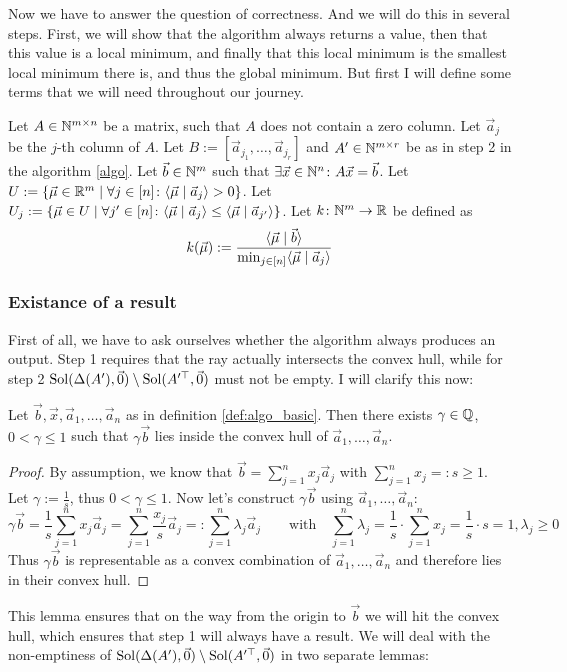 Now we have to answer the question of correctness. And we will do this in several steps. First, we will show that the algorithm always returns a value, then that this value is a local minimum, and finally that this local minimum is the smallest local minimum there is, and thus the global minimum. But first I will define some terms that we will need throughout our journey.
\begin{definition}
    \label{def:algo_basic}
    Let $A \in \mathbb{N}^{m \times n}$ be a matrix, such that $A$ does not contain a zero column. Let $\vec a_j$ be the $j$-th column of $A$. Let $B := [\vec a_{j_1}, \dots, \vec a_{j_r}]$ and $A' \in \mathbb{N}^{m\times r}$ be as in step 2 in the algorithm \ref{algo}. Let $\vec b \in \mathbb{N}^m$ such that $\exists \vec x \in \mathbb{N}^n\colon A\vec x = \vec b$. Let $U := \{\vec\mu \in \mathbb{R}^m\mid \forall j \in [n]\colon\langle \vec\mu \mid \vec a_j \rangle > 0\}$. Let $U_j := \{\vec\mu \in U \mid \forall j'\in[n]\colon \langle \vec\mu \mid \vec a_j \rangle \leq \langle \vec\mu \mid \vec a_{j'} \rangle\}$. Let $k\colon \mathbb{N}^m\to\mathbb{R}$ be defined as 
    $$k(\vec\mu) := \frac{\langle \vec\mu \mid \vec b \rangle}{\min_{j\in[n]}\langle \vec\mu \mid \vec a_j \rangle}$$
\end{definition}

\subsubsection{Existance of a result}
First of all, we have to ask ourselves whether the algorithm always produces an output. Step 1 requires that the ray actually intersects the convex hull, while for step 2 $\operatorname{Sol}(\Delta(A'), \vec0) \setminus \operatorname{Sol}(A'^\top, \vec0)$ must not be empty. I will clarify this now:

\begin{lemma}
    \label{lemma:b_behind_hull}
    Let $\vec b, \vec x, \vec a_1, \dots, \vec a_n$ as in definition \ref{def:algo_basic}. Then there exists $\gamma \in \mathbb{Q}$, $0 < \gamma \leq 1$ such that $\gamma \vec b$ lies inside the convex hull of $\vec a_1, \dots, \vec a_n$.
\end{lemma}
\begin{proof}
    By assumption, we know that $\vec b = \sum_{j=1}^{n}x_j \vec a_j$ with $\sum_{j=1}^{n}x_j =: s \geq 1$. Let $\gamma := \frac{1}{s}$, thus $0 < \gamma \leq 1$. Now let's construct $\gamma\vec b$ using $\vec a_1, \dots, \vec a_n$:
    $$\gamma\vec b = \frac{1}{s}\sum_{j=1}^{n}x_j \vec a_j = \sum_{j=1}^{n}\frac{x_j}{s}\vec a_j =: \sum_{j=1}^{n} \lambda_j\vec a_j \qquad \mathrm{with}\quad \sum_{j=1}^{n}\lambda_j = \frac{1}{s}\cdot \sum_{j=1}^{n} x_j = \frac{1}{s}\cdot s = 1, \lambda_j \geq 0$$
    Thus $\gamma\vec b$ is representable as a convex combination of $\vec a_1, \dots, \vec a_n$ and therefore lies in their convex hull.
\end{proof}
This lemma ensures that on the way from the origin to $\vec b$ we will hit the convex hull, which ensures that step 1 will always have a result. We will deal with the non-emptiness of $\operatorname{Sol}(\Delta(A'), \vec0)\setminus \operatorname{Sol}(A'^\top, \vec0)$ in two separate lemmas:

